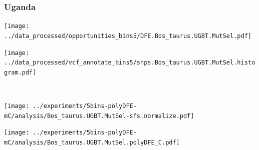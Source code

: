 \subsubsection{Uganda}

\begin{minipage}{0.49\linewidth}
    \texttt{[image: ../data\_processed/opportunities\_bins5/DFE.Bos\_taurus.UGBT.MutSel.pdf]}
\end{minipage}
\begin{minipage}{0.49\linewidth}
    \texttt{[image: ../data\_processed/vcf\_annotate\_bins5/snps.Bos\_taurus.UGBT.MutSel.histogram.pdf]}
\end{minipage}
\\
\begin{minipage}{0.49\linewidth}
    \texttt{[image: ../experiments/5bins-polyDFE-mC/analysis/Bos\_taurus.UGBT.MutSel-sfs.normalize.pdf]}
\end{minipage}
\begin{minipage}{0.4\linewidth}
    \texttt{[image: ../experiments/5bins-polyDFE-mC/analysis/Bos\_taurus.UGBT.MutSel.polyDFE\_C.pdf]}
\end{minipage}
